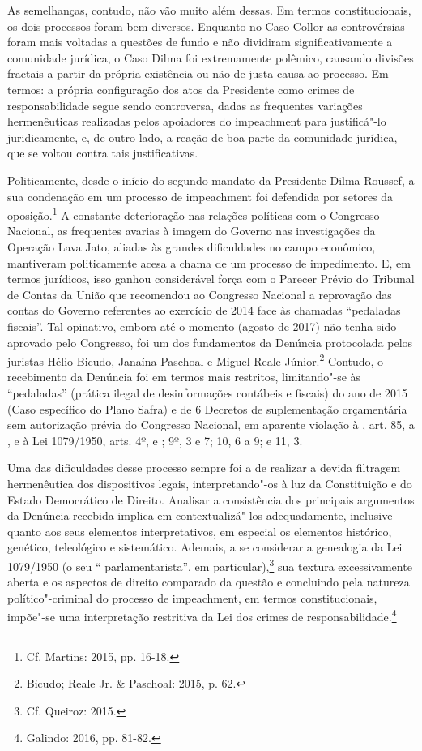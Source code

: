 As semelhanças, contudo, não vão muito além dessas. Em termos
constitucionais, os dois processos foram bem diversos. Enquanto no Caso
Collor as controvérsias foram mais voltadas a questões de fundo e não
dividiram significativamente a comunidade jurídica, o Caso Dilma foi
extremamente polêmico, causando divisões fractais a partir da própria
existência ou não de justa causa ao processo. Em termos: a própria
configuração dos atos da Presidente como crimes de responsabilidade
segue sendo controversa, dadas as frequentes variações hermenêuticas
realizadas pelos apoiadores do impeachment para justificá"-lo
juridicamente, e, de outro lado, a reação de boa parte da comunidade
jurídica, que se voltou contra tais justificativas.

Politicamente, desde o início do segundo mandato da Presidente Dilma
Roussef, a sua condenação em um processo de impeachment foi
defendida por setores da oposição.\footnote{Cf. Martins: 2015, pp. 16-18.} A
constante deterioração nas relações políticas com o Congresso Nacional,
as frequentes avarias à imagem do Governo nas investigações da Operação
Lava Jato, aliadas às grandes dificuldades no campo econômico,
mantiveram politicamente acesa a chama de um processo de impedimento. E,
em termos jurídicos, isso ganhou considerável força com o Parecer Prévio
do Tribunal de Contas da União que recomendou ao Congresso Nacional a
reprovação das contas do Governo referentes ao exercício de 2014 face às
chamadas ``pedaladas fiscais''. Tal opinativo, embora até o momento
(agosto de 2017) não tenha sido aprovado pelo Congresso, foi um dos
fundamentos da Denúncia protocolada pelos juristas Hélio Bicudo, Janaína
Paschoal e Miguel Reale Júnior.\footnote{Bicudo; Reale Jr. \& Paschoal: 2015, p.
62.} Contudo, o recebimento da Denúncia foi em termos mais restritos,
limitando"-se às ``pedaladas'' (prática ilegal de desinformações
contábeis e fiscais) do ano de 2015 (Caso específico do Plano Safra) e
de 6 Decretos de suplementação orçamentária sem autorização prévia do
Congresso Nacional, em aparente violação à , art. 85,  a , e à Lei
1079/1950, arts. 4º,  e ; 9º, 3 e 7; 10, 6 a 9; e 11, 3.

Uma das dificuldades desse processo sempre foi a de realizar a devida
filtragem hermenêutica dos dispositivos legais, interpretando"-os à luz
da Constituição e do Estado Democrático de Direito. Analisar a
consistência dos principais argumentos da Denúncia recebida implica em
contextualizá"-los adequadamente, inclusive quanto aos seus elementos
interpretativos, em especial os elementos histórico, genético,
teleológico e sistemático. Ademais, a se considerar a genealogia da Lei
1079/1950 (o seu `` parlamentarista'', em particular),\footnote{Cf. Queiroz:
2015.} sua textura excessivamente aberta e os aspectos de direito
comparado da questão e concluindo pela natureza político"-criminal do
processo de impeachment, em termos constitucionais, impõe"-se uma
interpretação restritiva da Lei dos crimes de responsabilidade.\footnote{Galindo:
2016, pp. 81-82.}


